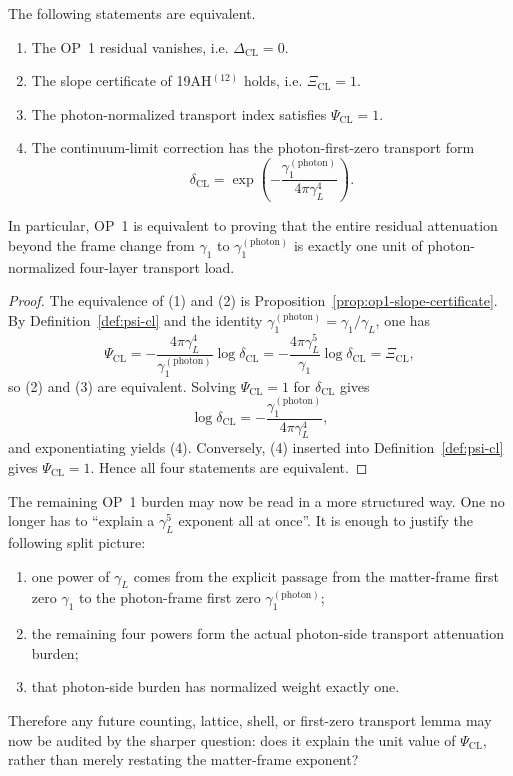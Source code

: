 \begin{proposition}
\label{prop:op1-frame-transport-split}
The following statements are equivalent.
\begin{enumerate}[leftmargin=2em]
  \item The OP~1 residual vanishes, i.e. \(\Delta_{\mathrm{CL}}=0\).
  \item The slope certificate of 19AH$^{(12)}$ holds, i.e. \(\Xi_{\mathrm{CL}}=1\).
  \item The photon-normalized transport index satisfies \(\Psi_{\mathrm{CL}}=1\).
  \item The continuum-limit correction has the photon-first-zero transport form
  \[
    \delta_{\mathrm{CL}}
    = \exp\!\left(-\frac{\gamma_1^{(\mathrm{photon})}}{4\pi\gamma_L^4}\right).
  \]
\end{enumerate}
In particular, OP~1 is equivalent to proving that the entire residual attenuation beyond the frame change from \(\gamma_1\) to \(\gamma_1^{(\mathrm{photon})}\) is exactly one unit of photon-normalized four-layer transport load.
\end{proposition}

\begin{proof}
The equivalence of (1) and (2) is Proposition~\ref{prop:op1-slope-certificate}. By Definition~\ref{def:psi-cl} and the identity \(\gamma_1^{(\mathrm{photon})}=\gamma_1/\gamma_L\), one has
\[
  \Psi_{\mathrm{CL}}
  =
  -\frac{4\pi\gamma_L^4}{\gamma_1^{(\mathrm{photon})}}\log \delta_{\mathrm{CL}}
  =
  -\frac{4\pi\gamma_L^5}{\gamma_1}\log \delta_{\mathrm{CL}}
  = \Xi_{\mathrm{CL}},
\]
so (2) and (3) are equivalent. Solving \(\Psi_{\mathrm{CL}}=1\) for \(\delta_{\mathrm{CL}}\) gives
\[
  \log \delta_{\mathrm{CL}} = -\frac{\gamma_1^{(\mathrm{photon})}}{4\pi\gamma_L^4},
\]
and exponentiating yields (4). Conversely, (4) inserted into Definition~\ref{def:psi-cl} gives \(\Psi_{\mathrm{CL}}=1\). Hence all four statements are equivalent.
\end{proof}

\begin{corollary}
\label{cor:op1-r03-target}
The remaining OP~1 burden may now be read in a more structured way. One no longer has to ``explain a \(\gamma_L^5\) exponent all at once''. It is enough to justify the following split picture:
\begin{enumerate}[leftmargin=2em]
  \item one power of \(\gamma_L\) comes from the explicit passage from the matter-frame first zero \(\gamma_1\) to the photon-frame first zero \(\gamma_1^{(\mathrm{photon})}\);
  \item the remaining four powers form the actual photon-side transport attenuation burden;
  \item that photon-side burden has normalized weight exactly one.
\end{enumerate}
Therefore any future counting, lattice, shell, or first-zero transport lemma may now be audited by the sharper question: does it explain the unit value of \(\Psi_{\mathrm{CL}}\), rather than merely restating the matter-frame exponent?
\end{corollary}


